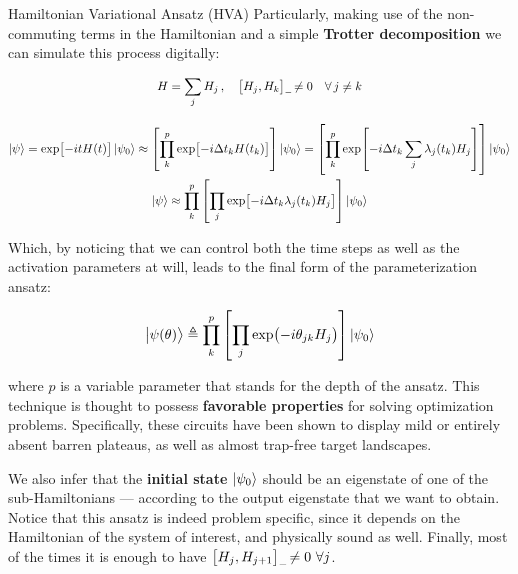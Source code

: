 \begin{frame}[allowframebreaks]{Hamiltonian Variational Ansatz (HVA)}
  Particularly, making use of the non-commuting terms in the Hamiltonian and a simple \textbf{Trotter decomposition} we can simulate this process digitally:

  \begin{gather*}
    H =
      \sum_{j}{H_j} \qc \com{H_j}{H_{k}} \neq 0 \quad\forall\, j \neq k \\[1em]
    \ket{\psi} = \exp[-i t H(t)] \ket{\psi_0} \approx
      \qty[ \prod_{k}^{p} \exp[-i \Delta t_k H(t_k)] ] \ket{\psi_0} =
      \qty[ \prod_{k}^{p} \exp[-i \Delta t_k \sum_j \lambda_j(t_k) H_j] ]
      \ket{\psi_0} \\
    \ket{\psi} \approx \prod_{k}^{p}
      \qty[\prod_{j} \exp[-i \Delta t_k \lambda_j(t_k) H_j]] \ket{\psi_0}
  \end{gather*}

\break

  Which, by noticing that we can control both the time steps as well as the activation parameters at will, leads to the final form of the parameterization ansatz:

  \begin{gather*}
    \ket{\psi\qty(\theta)} \triangleq \prod_{k}^{p}
      \qty[\prod_{j} \exp(-i \theta_{jk} H_j)] \ket{\psi_0}
  \end{gather*}

  where $p$ is a variable parameter that stands for the depth of the ansatz. This technique is thought to possess \textbf{favorable properties} for solving optimization problems. Specifically, these circuits have been shown to display mild or entirely absent barren plateaus, as well as almost trap-free target landscapes.

  \medskip

  We also infer that the \textbf{initial state} $\ket{\psi_0}$ should be an eigenstate of one of the sub-Hamiltonians --- according to the output eigenstate that we want to obtain. Notice that this ansatz is indeed problem specific, since it depends on the Hamiltonian of the system of interest, and physically sound as well. Finally, most of the times it is enough to have $\com{H_j}{H_{j+1}} \neq 0 \ \forall j$.

\end{frame}
